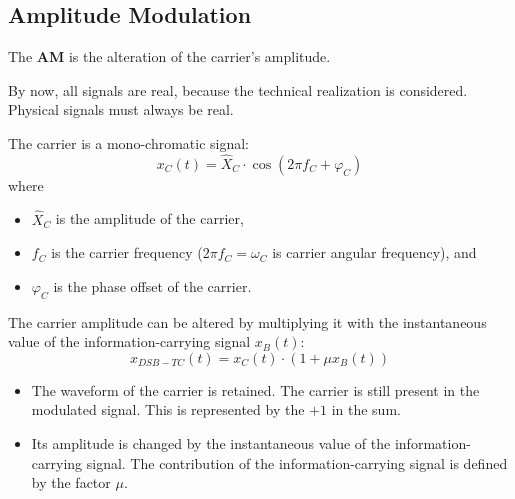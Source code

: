 \begin{refsection}
\label{sec:ch05:am}

\subsection{Amplitude Modulation}

The  \textbf{\acf{AM}} is the alteration of the carrier's amplitude.

\begin{attention}
	By now, all signals are real, because the technical realization is considered. Physical signals must always be real.
\end{attention}

The carrier is a mono-chromatic signal:
\begin{equation}
	x_C(t) = \hat{X}_C \cdot \cos\left(2\pi f_C + \varphi_C\right)
\end{equation}
where
\begin{itemize}
	\item $\hat{X}_C$ is the amplitude of the carrier,
	\item $f_C$ is the carrier frequency ($2\pi f_C = \omega_C$ is carrier angular frequency), and
	\item $\varphi_C$ is the phase offset of the carrier.
\end{itemize}

The carrier amplitude can be altered by multiplying it with the instantaneous value of the information-carrying signal $x_B(t)$:
\begin{equation}
	x_{DSB-TC}(t) = x_C(t) \cdot \left(1 + \mu x_B(t)\right)
	\label{eq:ch05:amdsb_timedomain}
\end{equation}
\begin{itemize}
	\item The waveform of the carrier is retained. The carrier is still present in the modulated signal. This is represented by the $+1$ in the sum.
	\item Its amplitude is changed by the instantaneous value of the information-carrying signal. The contribution of the information-carrying signal is defined by the factor $\mu$.
\end{itemize}

\begin{figure}[H]
	\centering
	

\end{figure}
\end{refsection}
